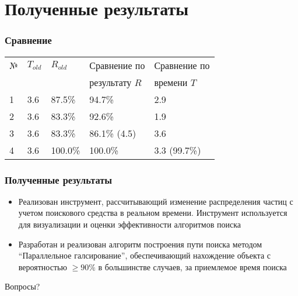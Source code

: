 \documentclass{beamer} %
\theoremstyle{definition} %
\begin{document}
\section{Полученные результаты}
\begin{frame}
  \frametitle{Сравнение}
\begin{table}[ht]
  \centering
  \begin{tabular}{|l|l|l|l|l|}
\hline
    № & $T_{old}$ & $R_{old}$ & Сравнение по & Сравнение по \\
         & & & результату $R$ & времени $T$ \\
\hline
    1 & 3.6 & 87.5\% & 94.7\% & 2.9 \\ 
    2 & 3.6 & 83.3\% & 92.6\% & 1.9 \\
    3 & 3.6 & 83.3\% & 86.1\% (4.5) & 3.6 \\
    4 & 3.6 & 100.0\%& 100.0\%& 3.3 (99.7\%) \\
\hline

  \end{tabular}
\end{table}

\end{frame}

\begin{frame}
\frametitle{Полученные результаты}
\begin{itemize}
\item{Реализован инструмент, рассчитывающий изменение распределения частиц с учетом поискового средства в реальном времени. Инструмент используется для визуализации и оценки эффективности алгоритмов поиска}
\item{Разработан и реализован алгоритм построения пути поиска методом ``Параллельное галсирование'', обеспечивающий нахождение объекта с вероятностью $\ge 90\%$ в большинстве случаев, за приемлемое время поиска}
\end{itemize}
\end{frame}

\begin{frame}
  \begin{center}
    \Huge
    {\color{blue} Вопросы?}
  \end{center}
\end{frame}
\end{document}
